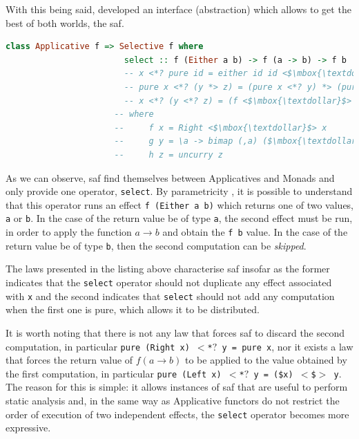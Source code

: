 \documentclass[
  oneside,
  11pt, a4paper,
  footinclude=true,
  headinclude=true,
  cleardoublepage=empty
]{scrbook}
\theoremstyle{definition}
\theoremstyle{definition}
\begin{document}
	With this being said, \cite{andrey2019selective} developed an interface (abstraction) which allows to get the best of both worlds, the \gls{saf}.
	            
	            \begin{lstlisting}[mathescape, language=Haskell, label={lst:saf}, caption={Selective Applicative Functor laws},captionpos=b]
	                class Applicative f => Selective f where
	                    select :: f (Either a b) -> f (a -> b) -> f b
	                    -- x <*? pure id = either id id <$\mbox{\textdollar}$> x
	                    -- pure x <*? (y *> z) = (pure x <*? y) *> (pure x <*? z)
	                    -- x <*? (y <*? z) = (f <$\mbox{\textdollar}$> x) <*? (g <$\mbox{\textdollar}$> y) <*? (h <$\mbox{\textdollar}$> z)
                      -- where
                      --     f x = Right <$\mbox{\textdollar}$> x
                      --     g y = \a -> bimap (,a) ($\mbox{\textdollar}$a) y
                      --     h z = uncurry z
	            \end{lstlisting}{}
	            
	As we can observe, \gls{saf} find themselves between Applicatives and Monads and only provide one operator, \texttt{select}. By parametricity \citep{Wadler:1989:TF:99370.99404}, it is possible to understand that this operator runs an effect \texttt{f (Either a b)} which returns one of two values, \texttt{a} or \texttt{b}. In the case of the return value be of type \texttt{a}, the second effect must be run, in order to apply the function $a \rightarrow b$ and obtain the \texttt{f b} value. In the case of the return value be of type \texttt{b}, then the second computation can be \emph{skipped}.
	            
	The laws presented in the listing above characterise \gls{saf} insofar as the former indicates that the \texttt{select} operator should not duplicate any effect associated with \texttt{x} and the second indicates that \texttt{select} should not add any computation when the first one is pure, which allows it to be distributed.
	            
	It is worth noting that there is not any law that forces \gls{saf} to discard the second computation, in particular \texttt{pure (Right x) $<$*$?$ y = pure x}, nor it exists a law that forces the return value of $f (a \rightarrow b)$ to be applied to the value obtained by the first computation, in particular \texttt{pure (Left x) $<$*$?$ y = (\$x) $<$\$$>$ y}. The reason for this is simple: it allows instances of \gls{saf} that are useful to perform static analysis and, in the same way as Applicative functors do not restrict the order of execution of two independent effects, the \texttt{select} operator becomes more expressive.
	            
\end{document}
